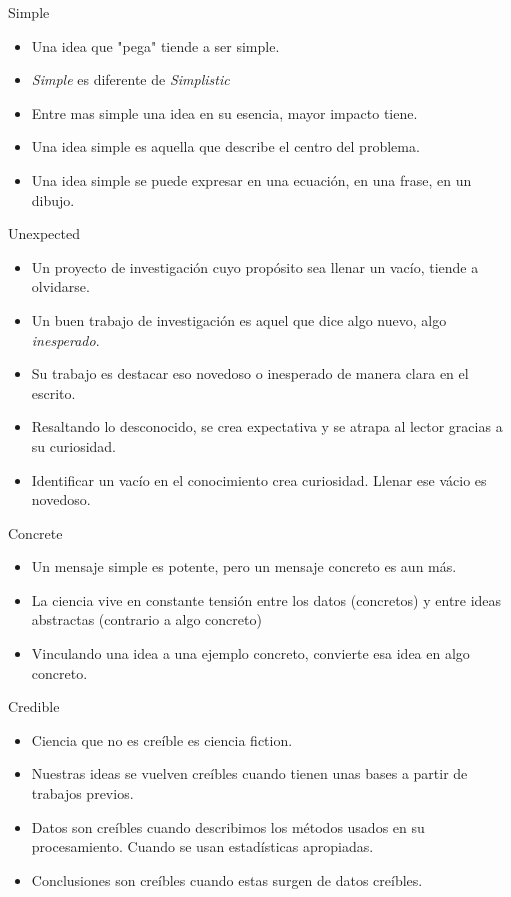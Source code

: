 \documentclass[
10pt,
aspectratio=169,
]{beamer}
\begin{document}
\begin{frame}[c]{\alert{S}imple}
\begin{itemize}
\item Una idea que "pega" tiende a ser simple.
\item \emph{Simple} es diferente de \emph{Simplistic}
\item \alert{Entre mas simple una idea en su esencia, mayor impacto tiene.}
\item Una idea simple es aquella que describe el centro del problema.
\item Una idea simple se puede expresar en una ecuaci\'on, en una frase, en un dibujo.
\end{itemize}
\end{frame}

\begin{frame}[c]{\alert{U}nexpected}
\begin{itemize}
\item Un proyecto de investigaci\'on cuyo prop\'osito sea llenar un vac\'io, tiende a olvidarse.
\item Un buen trabajo de investigaci\'on es aquel que dice algo nuevo, algo \emph{inesperado}.
\item Su trabajo es destacar eso novedoso o inesperado de manera clara en el escrito.
\item Resaltando lo desconocido, se crea expectativa y se atrapa al lector gracias a su curiosidad.
\item Identificar un vac\'io en el conocimiento crea curiosidad. Llenar ese v\'acio es novedoso.
\end{itemize}
\end{frame}

\begin{frame}[c]{\alert{C}oncrete}
\begin{itemize}
\item Un mensaje simple es potente, pero un mensaje concreto es aun m\'as.
\item La ciencia vive en constante tensi\'on entre los datos (concretos) y entre ideas abstractas (contrario a algo concreto)
\item Vinculando una idea a una ejemplo concreto, convierte esa idea en algo concreto.
\end{itemize}
\end{frame}

\begin{frame}[c]{\alert{C}redible}
\begin{itemize}
\item Ciencia que no es creíble es ciencia fiction.
\item \alert{Nuestras ideas se vuelven cre\'ibles cuando tienen unas bases a partir de trabajos previos.}
\item Datos son cre\'ibles cuando describimos los m\'etodos usados en su procesamiento. Cuando se usan estadísticas apropiadas.
\item Conclusiones son cre\'ibles cuando estas surgen de datos cre\'ibles.
\end{itemize}
\end{frame}
\end{document}
